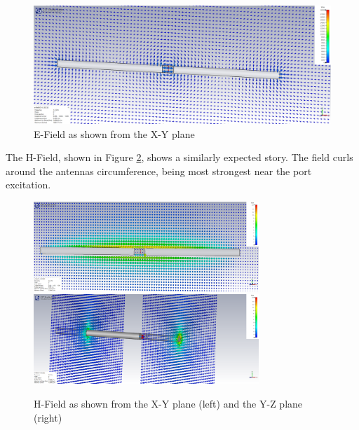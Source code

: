 \documentclass[colorlinks,11pt,a4paper,normalphoto,withhyper,ragged2e]{altareport}
\begin{document}
\begin{figure}[h]
	\centering
	\hspace{\fill}\includegraphics[width=14cm,valign=c]{Images/hw-e-field-xy-plane.png}\hspace{\fill}
	\caption{E-Field as shown from the X-Y plane}  %
	\label{fig:hw_e_field_xy}
\end{figure}

The H-Field, shown in Figure \ref{fig:hw_h_field_xy_yz}, shows a similarly expected story. The field curls around the antennas circumference, being most strongest near the port excitation. \linebreak

\begin{figure}[h]
	\centering
	\hspace{\fill}\includegraphics[width=8.5cm,valign=c]{Images/hw-h-field-xy-plane.png}\hspace{\fill}\includegraphics[width=8.5cm,valign=c]{Images/hw-h-field-yz-plane.png}\hspace{\fill}
	\caption{H-Field as shown from the X-Y plane (left) and the Y-Z plane (right)}  %
	\label{fig:hw_h_field_xy_yz}
\end{figure}
\end{document}
